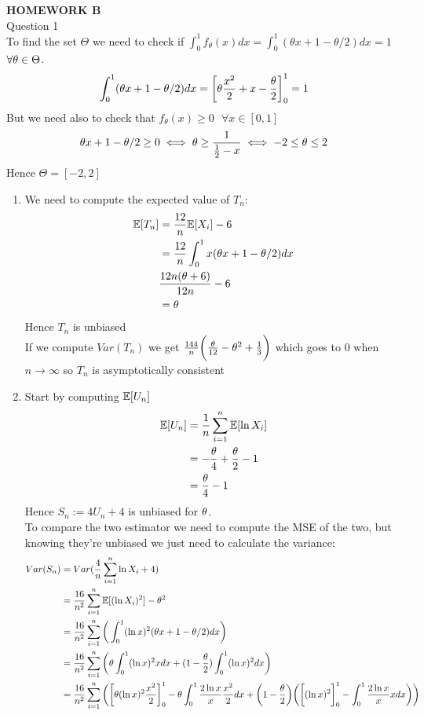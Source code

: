 \textbf{HOMEWORK B}\\
Question 1\\
To find the set $\Theta$ we need to check if $\int_{0}^{1} f_\theta (x) dx=\int_{0}^{1} (\theta x +1 - \theta/2)dx=1$  $\forall \theta \in \Theta$.
$$\int_{0}^{1} (\theta x +1 - \theta/2)dx=\bigg[ \theta \frac{x^2}{2} + x - \frac{\theta}{2} \bigg]_0^1=1$$
But we need also to check that $f_\theta (x)\geq 0 \ \ \ \forall x\in [0,1]$
$$\theta x +1 - \theta/2 \geq 0 \iff \theta \geq \frac{1}{\frac{1}{2}-x}\iff -2\leq \theta \leq 2$$
Hence $\Theta=[-2,2]$
\begin{enumerate}
	\item We need to compute the expected value of $T_n$:
	\[
	\begin{split}
	\mathbb{E}[T_n]&=\frac{12}{n}\mathbb{E}[X_i]-6\\&=\frac{12}{n}\int_{0}^{1} x(\theta x +1 - \theta/2)dx\\&	\frac{12n(\theta+6)}{12n}-6\\&=\theta
	\end{split}
	\]
	Hence $T_n$ is unbiased\\
	If we compute $Var(T_n)$ we get $\frac{144}{n}\bigg(\frac{\theta}{12} - \theta^2 +\frac{1}{3}\bigg)$ which goes to $0$ when $n\to \infty$  so $T_n$ is asymptotically consistent
	\item Start by computing $\mathbb{E}[U_n]$
	\[
	\begin{split}
	\mathbb{E}[U_n]&=
	\frac{1}{n}\sum_{i=1}^n \mathbb{E}[\ln X_i]\\&=-\frac{\theta}{4}+\frac{\theta}{2}-1\\&=\frac{\theta}{4}-1
	\end{split}
	\]
	Hence $S_n:=4U_n +4$ is unbiased for $\theta$.\\
	To compare the two estimator we need to compute the MSE of the two, but knowing they're unbiased we just need to calculate the variance:
	\[
	\begin{split}
	Var(S_n)&=Var(\frac{4}{n}\sumi \ln X_i+4)\\
	&=\frac{16}{n^2}\sumi \e[(\ln X_i)^2]- \te^2\\
	&=\frac{16}{n^2}\sumi \bigg(\int_{0}^{1} (\ln x)^2(\theta x +1 - \theta/2)dx \bigg)\\
	&=\frac{16}{n^2}\sumi \bigg(\te \int_{0}^{1} (\ln x)^2x dx +(1-\frac{\te}{2})\int_{0}^{1} (\ln x)^2 dx \bigg)\\
	&=\frac{16}{n^2}\sumi \bigg( \bigg[\te (\ln x)^2 \frac{x^2}{2} \bigg]_0^1 -\te \int_{0}^{1} \frac{2 \ln x}{x} \frac{x^2}{2}dx +\bigg(1-\frac{\te}{2}\bigg)\bigg( \bigg[ (\ln x)^2  \bigg]_0^1 -\int_{0}^{1} \frac{2 \ln x}{x} x dx \bigg)   \bigg)\\

\end{split}\]
\end{enumerate}

